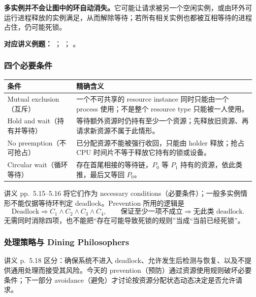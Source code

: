 \textbf{多实例并不会让图中的环自动消失。}它可能让请求被另一个空闲实例，或由环外可运行进程释放的实例满足，从而解除等待；若所有相关实例也都被互相等待的进程占住，仍可能死锁。

\textbf{对应讲义例题：}
；
；
。


\subsubsection{四个必要条件}

\begin{center}
\begin{tabularx}{\textwidth}{@{}p{4.05cm}X@{}}
  \toprule
  条件 & 精确含义 \\
  \midrule
  Mutual exclusion（互斥） &
  一个不可共享的 resource instance 同时只能由一个 process 使用；不是整个 resource type 只能被一人使用。 \\
  Hold and wait（持有并等待） &
  等待额外资源时仍持有至少一个资源；先释放旧资源、再请求新资源不属于此情形。 \\
  No preemption（不可抢占） &
  已分配资源不能被强行收回，只能由 holder 释放；抢占 CPU 时间片不等于释放它持有的锁或设备。 \\
  Circular wait（循环等待） &
  存在首尾相接的等待链，$P_0$ 等 $P_1$ 持有的资源，依此类推，最后又等回 $P_0$。 \\
  \bottomrule
\end{tabularx}
\end{center}

讲义 pp.~5.15--5.16 将它们作为 necessary conditions（必要条件）；一般多实例情形不能仅据等待环判定 deadlock。Prevention 所用的逻辑是
\[
  \text{Deadlock}\Longrightarrow C_1\land C_2\land C_3\land C_4,
  \qquad
  \text{保证至少一项不成立}\Longrightarrow\text{无此类 deadlock}.
\]
无需同时消除四项，也不能把“存在可能导致死锁的规则”当成“当前已经死锁”。

\subsubsection{处理策略与 Dining Philosophers}

讲义 p.~5.18 区分：确保系统不进入 deadlock、允许发生后检测与恢复、以及不提供通用处理而接受其风险。今天的 prevention（预防）通过资源使用规则破坏必要条件；下一部分 avoidance（避免）才讨论按资源分配状态动态决定是否允许请求。

